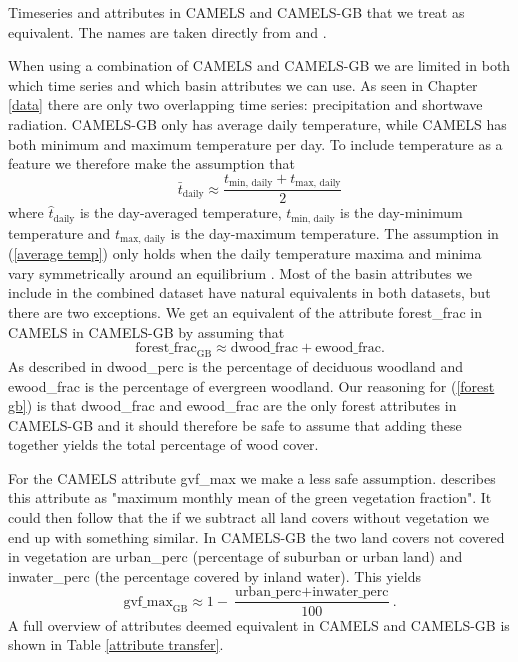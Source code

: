 \begin{table}
    \centering
    \caption{Timeseries and attributes in CAMELS and CAMELS-GB that we treat as 
    equivalent. The names are taken directly from \citet{CAMELS_US} and \citet{CAMELS_GB}.}
    
    \label{attribute transfer}
\end{table}
When using a combination of CAMELS and CAMELS-GB we are limited in both which 
time series and which basin attributes we can use.
As seen in Chapter \ref{data} there are only two overlapping time series: precipitation 
and shortwave radiation. CAMELS-GB only has 
average daily temperature, while CAMELS has both minimum and maximum temperature 
per day. To include temperature as a feature we therefore make the assumption that 
\begin{equation}
    \bar{t}_\text{daily} \approx \frac{t_\text{min, daily} + t_\text{max, daily}}{2} \label{average temp}
\end{equation}
where $\hat{t}_\text{daily}$ is the day-averaged temperature, $t_\text{min, daily}$ is 
the day-minimum temperature and $t_\text{max, daily}$ is the day-maximum temperature.
The assumption in (\ref{average temp}) only holds when the daily temperature maxima 
and minima vary symmetrically around an equilibrium  \citationneeded.
Most of the basin attributes we include in the combined dataset have natural equivalents 
in both datasets, but there are two exceptions. We get an equivalent of the attribute 
forest\_frac in CAMELS in CAMELS-GB by assuming that
\begin{equation}
    \text{forest\_frac}_\text{GB} \approx \text{dwood\_frac} + \text{ewood\_frac}. \label{forest gb}
\end{equation}
As described in \citet{CAMELS_GB} dwood\_perc is the percentage of deciduous woodland 
and ewood\_frac is the percentage of evergreen woodland.
Our reasoning for (\ref{forest gb}) is that dwood\_frac and ewood\_frac are the only 
forest attributes in CAMELS-GB and it should therefore be safe to assume that adding 
these together yields the total percentage of wood cover.

For the CAMELS attribute gvf\_max we make a less safe assumption. \citet{CAMELS_US} 
describes this attribute as "maximum monthly mean of the green vegetation fraction". 
It could then follow that the if we subtract all land covers without vegetation 
we end up with something similar. In CAMELS-GB the two land covers not covered in 
vegetation are urban\_perc (percentage of suburban or urban land) and inwater\_perc 
(the percentage covered by inland water). This yields
\begin{equation}
    \text{gvf\_max}_\text{GB} \approx 1 - \frac{\text{urban\_perc} + \text{inwater\_perc}}{100}. \label{gvf gb}
\end{equation}
A full overview of attributes deemed equivalent in CAMELS and CAMELS-GB is shown in 
Table \ref{attribute transfer}.

